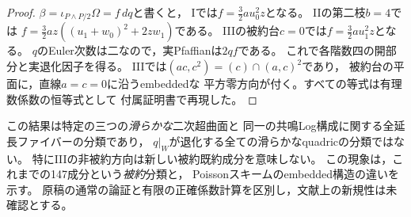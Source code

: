 \begin{proof}
$\beta=\iota_{P\wedge P/2}\Omega=f\,dq$と書くと，
Iでは$f=\frac32a u_0^2z$となる。
IIの第二枝$b=4$では
$f=\frac32a z((u_1+w_0)^2+2zw_1)$である。
IIIの被約台$c=0$では$f=\frac32a u_1^2z$となる。
$q$のEuler次数は二なので，実Pfaffianは$2qf$である。
これで各階数四の開部分と実退化因子を得る。
IIIでは$(ac,c^2)=(c)\cap(a,c)^2$であり，
被約台の平面に，直線$a=c=0$に沿うembeddedな
平方零方向が付く。すべての等式は有理数係数の恒等式として
付属証明書で再現した。
\end{proof}

\begin{remark}
この結果は特定の三つの\emph{滑らかな}二次超曲面と
同一の共鳴Log構成に関する全延長ファイバーの分類であり，
$q|_W$が退化する全ての滑らかなquadricの分類ではない。
特にIIIの非被約方向は新しい被約既約成分を意味しない。
この現象は，これまでの147成分という\emph{被約}分類と，
Poissonスキームのembedded構造の違いを示す。
原稿の通常の論証と有限の正確係数計算を区別し，文献上の新規性は未確認とする。
\end{remark}
